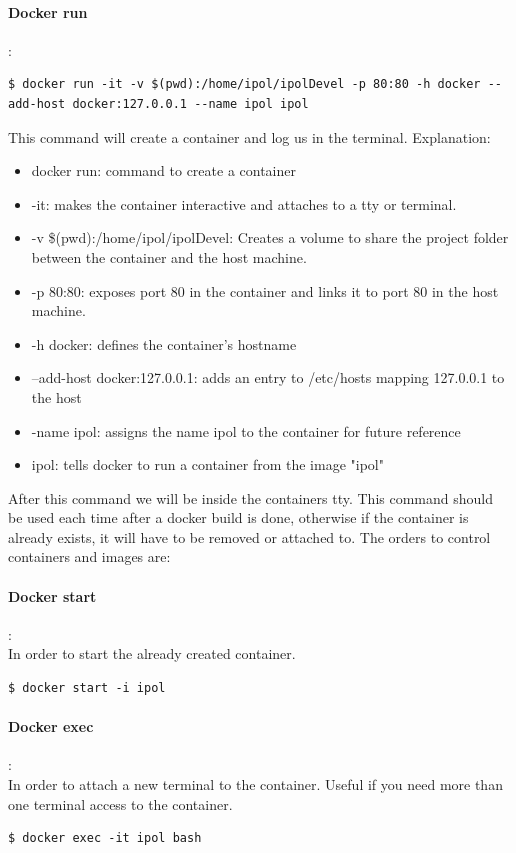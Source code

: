 \documentclass[a4paper,12pt]{article}
\begin{document}
\paragraph{Docker run}:\\
\begin{lstlisting}[firstnumber=1,breaklines]
  $ docker run -it -v $(pwd):/home/ipol/ipolDevel -p 80:80 -h docker --add-host docker:127.0.0.1 --name ipol ipol
\end{lstlisting}

This command will create a container and log us in the terminal. Explanation:
\begin{itemize}
  \item docker run: command to create a container
  \item -it: makes the container interactive and attaches to a tty or terminal.
  \item -v \$(pwd):/home/ipol/ipolDevel: Creates a volume to share the project folder between the container and the host machine.
  \item -p 80:80: exposes port 80 in the container and links it to port 80 in the host machine.
  \item -h docker: defines the container's hostname
  \item --add-host docker:127.0.0.1: adds an entry to /etc/hosts mapping 127.0.0.1 to the host
  \item -name ipol: assigns the name ipol to the container for future reference
  \item ipol: tells docker to run a container from the image "ipol"
\end{itemize}

After this command we will be inside the containers tty. This command should be used each time after a docker build is done,
otherwise if the container is already exists, it will have to be removed or attached to. The orders to control containers and images are:

\paragraph{Docker start}:\\
In order to start the already created container.
\begin{lstlisting}[firstnumber=1,breaklines]
  $ docker start -i ipol
\end{lstlisting}

\paragraph{Docker exec}:\\
In order to attach a new terminal to the container. Useful if you need more than one terminal access to the container.
\begin{lstlisting}[firstnumber=1,breaklines]
  $ docker exec -it ipol bash
\end{lstlisting}
\end{document}
